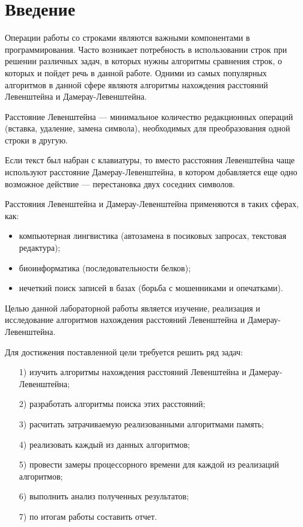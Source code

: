 
\chapter*{Введение}

Операции работы со строками являются важными компонентами в программирования. Часто возникает потребность в использовании строк при решении различных
задач, в которых нужны алгоритмы сравнения строк, о которых
и пойдет речь в данной работе. Одними из самых популярных алгоритмов в данной сфере являютя алгоритмы нахождения расстояний Левенштейна и Дамерау-Левенштейна.

Расстояние Левенштейна --– минимальное количество редакционных операций (вставка, удаление, замена символа), необходимых для преобразования одной строки в другую. 

Если текст был набран с клавиатуры, то вместо расстояния Левенштейна чаще используют расстояние Дамерау-Левенштейна, в котором добавляется еще одно возможное действие --- перестановка двух соседних символов.

Расстояния Левенштейна и Дамерау-Левенштейна применяются в таких сферах, как: 
\begin{itemize}
	\item компьютерная лингвистика (автозамена в посиковых запросах, текстовая редактура);
	\item биоинформатика (последовательности белков);
	\item нечеткий поиск записей в базах (борьба с мошенниками и опечатками).
\end{itemize}

Целью данной лабораторной работы является изучение, реализация и исследование
алгоритмов нахождения расстояний Левенштейна и Дамерау-Левенштейна.

Для достижения поставленной цели требуется решить ряд задач:
\begin{enumerate}
	\item[1)] изучить алгоритмы нахождения расстояний Левенштейна и Дамерау-Левенштейна;
	\item[2)] разработать алгоритмы поиска этих расстояний;
	\item[3)] расчитать затрачиваемую реализованными алгоритмами память;
	\item[4)] реализовать каждый из данных алгоритмов;
	\item[5)] провести замеры процессорного времени для каждой из реализаций алгоритмов;
 	\item[6)] выполнить анализ полученных результатов;
	\item[7)] по итогам работы составить отчет.
\end{enumerate}

\newpage
